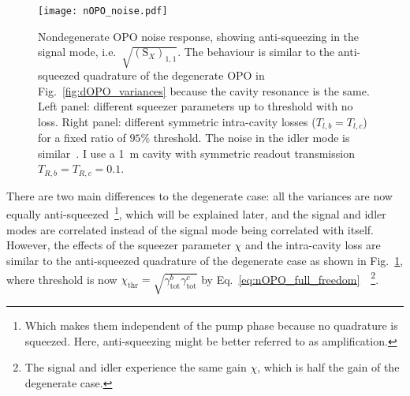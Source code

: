 \begin{figure}
	\centering
	\texttt{[image: nOPO\_noise.pdf]}
	\caption{Nondegenerate OPO noise response, showing anti-squeezing in the signal mode, i.e.\ $\sqrt{(\text{S}_X)_{1,1}}$. The behaviour is similar to the anti-squeezed quadrature of the degenerate OPO in Fig.~\ref{fig:dOPO_variances} because the cavity resonance is the same. Left panel: different squeezer parameters up to threshold with no loss. Right panel: different symmetric intra-cavity losses ($T_{l,b}=T_{l,c}$) for a fixed ratio of $95\%$ threshold. The noise in the idler mode is similar~\cite{schoriNarrowbandFrequencyTunable2002}. I use a 1~m cavity with symmetric readout transmission $T_{R,b}=T_{R,c}=0.1$.}
	\label{fig:nOPO_variances}
\end{figure}

There are two main differences to the degenerate case: all the variances are now equally anti-squeezed~\footnote{Which makes them independent of the pump phase because no quadrature is squeezed. Here, anti-squeezing might be better referred to as amplification.}, which will be explained later, and the signal and idler modes are correlated instead of the signal mode being correlated with itself. %
However, the effects of the squeezer parameter $\chi$ and the intra-cavity loss are similar to the anti-squeezed quadrature of the degenerate case as shown in Fig.~\ref{fig:nOPO_variances}, where threshold is now $\chi_\text{thr}=\sqrt{\gamma^b_\text{tot}\gamma^c_\text{tot}}$ by Eq.~\ref{eq:nOPO_full_freedom}~\cite{schoriNarrowbandFrequencyTunable2002,martinelli2001classical}~\footnote{The signal and idler experience the same gain $\chi$, which is half the gain of the degenerate case.}. %
